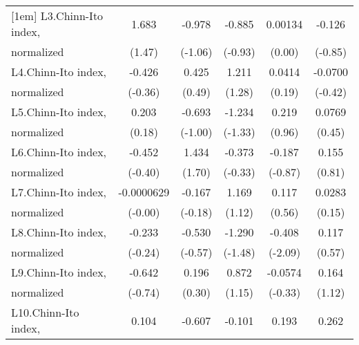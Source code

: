 {\begin{tabular}{l*{5}{c}}
[1em]
L3.Chinn-Ito index, &       1.683         &      -0.978         &      -0.885         &     0.00134         &      -0.126         \\
normalized          &      (1.47)         &     (-1.06)         &     (-0.93)         &      (0.00)         &     (-0.85)         \\
[1em]
L4.Chinn-Ito index, &      -0.426         &       0.425         &       1.211         &      0.0414         &     -0.0700         \\
normalized          &     (-0.36)         &      (0.49)         &      (1.28)         &      (0.19)         &     (-0.42)         \\
[1em]
L5.Chinn-Ito index, &       0.203         &      -0.693         &      -1.234         &       0.219         &      0.0769         \\
normalized          &      (0.18)         &     (-1.00)         &     (-1.33)         &      (0.96)         &      (0.45)         \\
[1em]
L6.Chinn-Ito index, &      -0.452         &       1.434         &      -0.373         &      -0.187         &       0.155         \\
normalized          &     (-0.40)         &      (1.70)         &     (-0.33)         &     (-0.87)         &      (0.81)         \\
[1em]
L7.Chinn-Ito index, &  -0.0000629         &      -0.167         &       1.169         &       0.117         &      0.0283         \\
normalized          &     (-0.00)         &     (-0.18)         &      (1.12)         &      (0.56)         &      (0.15)         \\
[1em]
L8.Chinn-Ito index, &      -0.233         &      -0.530         &      -1.290         &      -0.408\sym{*}  &       0.117         \\
normalized          &     (-0.24)         &     (-0.57)         &     (-1.48)         &     (-2.09)         &      (0.57)         \\
[1em]
L9.Chinn-Ito index, &      -0.642         &       0.196         &       0.872         &     -0.0574         &       0.164         \\
normalized          &     (-0.74)         &      (0.30)         &      (1.15)         &     (-0.33)         &      (1.12)         \\
[1em]
L10.Chinn-Ito index,&       0.104         &      -0.607         &      -0.101         &       0.193         &       0.262         \\

\end{tabular}}
